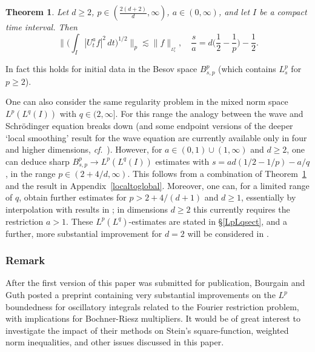 \documentclass[11pt]{amsart}
\newtheorem{theorem}{Theorem}[section]
\theoremstyle{definition}
\numberwithin{theorem}{section}
\numberwithin{definition}{section}
\newcommand{\ci}[1]{_{{}_{\!\scriptstyle{#1}}}}
\newcommand{\note}[1]{\footnote{\texttt{\Small #1}}}
\def\cf{{\it cf}}
\def\lc{\lesssim}
\begin{document}
\begin{theorem}\label{wavey} Let   $d\ge 2$, $p\in(\frac{2(d+2)}{d},\infty)$, $a\in(0,\infty)$, and let $I$ be a compact time interval. Then
\begin{equation}\label{psa}
\Big\|\Big(\int_I|U^a_t f|^2 \,dt\Big)^{1/2}\Big\|_{p}
\lc \|f\|\ci{L^p_{s}},\quad
\frac sa =d\Big(\frac{1}{2}-\frac{1}{p}\Big)-\frac{1}{2}.
\end{equation}
\end{theorem}
\noindent In fact
 this holds for initial data in the Besov space $B^{p}_{s,p} $ (which contains $L^p_s$ for  $p\ge 2$).

One can also consider the same regularity problem
in the mixed norm space $L^p(L^q(I))$ with $q\in(2,\infty]$.
For this range the analogy between the wave and Schr\"odinger equation breaks down
(and  some endpoint versions of the deeper `local smoothing'
 result for the wave equation are currently available only in  four and higher
dimensions, \cf.~\cite{honase}).
However, for  $a\in (0,1)\cup(1,\infty)$ and $d\ge 2$, one can deduce sharp
$B^{p}_{s,p}\to L^p(L^q(I))$
estimates with
$s =ad(1/2-1/p)-a/q$,
 in the range
$p\in(2+ 4/d,\infty)$.
This follows
from a combination of Theorem~\ref{wavey} and the  result in  Appendix~\ref{localtoglobal}.
Moreover,
one can, for a limited
range of $q$, obtain further estimates for $p>2+4/(d+1)$ and $d\ge 1$,
 essentially by interpolation with results in
\cite{rose}; in dimensions $d\ge 2$
this currently requires the restriction $a>1$.
 These $L^p(L^q)$-estimates are stated in \S\ref{LpLqsect},
and a further, more substantial improvement for $d=2$
will be considered in
\cite{lerose2}.

\subsubsection*{Remark} After the first version of this paper was submitted
for publication,
Bourgain and
Guth posted a preprint \cite{bogu}  containing  very substantial
 improvements on the
$L^p$  boundedness for oscillatory integrals related to the Fourier
restriction problem, with implications for Bochner-Riesz
multipliers. It would be of great interest to investigate the impact
of their methods on Stein's square-function, weighted norm
inequalities, and other issues discussed in this paper.
\end{document}
